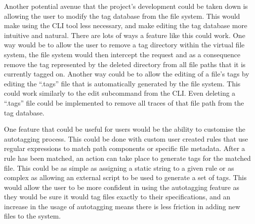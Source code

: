 Another potential avenue that the project's development could be taken down is
allowing the user to modify the tag database from the file system. This would
make using the CLI tool less necessary, and make editing the tag database more
intuitive and natural. There are lots of ways a feature like this could work.
One way would be to allow the user to remove a tag directory within the virtual
file system, the file system would then intercept the request and as a
consequence remove the tag represented by the deleted directory from all file
paths that it is currently tagged on. Another way could be to allow the editing
of a file's tags by editing the ``.tags'' file that is automatically generated
by the file system. This could work similarly to the edit subcommand from the
CLI. Even deleting a ``.tags'' file could be implemented to remove all traces
of that file path from the tag database.

One feature that could be useful for users would be the ability to customise
the autotagging process. This could be done with custom user created rules that
use regular expressions to match path components or specific file metadata.
After a rule has been matched, an action can take place to generate tags for
the matched file. This could be as simple as assigning a static string to a
given rule or as complex as allowing an external script to be used to generate
a set of tags. This would allow the user to be more confident in using the
autotagging feature as they would be sure it would tag files exactly to their
specifications, and an increase in the usage of autotagging means there is less
friction in adding new files to the system.

